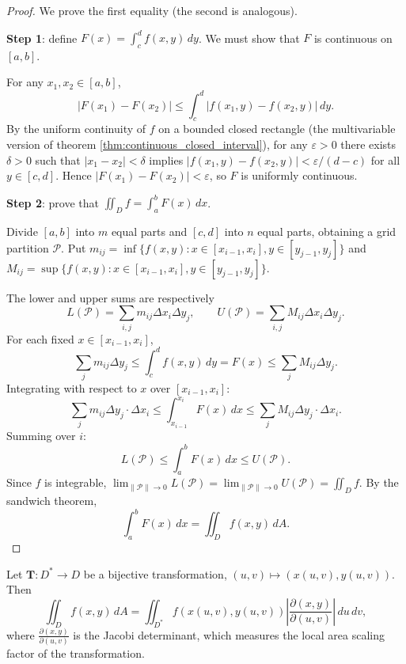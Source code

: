 \begin{proof}
We prove the first equality (the second is analogous).

\textbf{Step 1}: define $F(x) = \int_c^d f(x,y)\,dy$. We must show that $F$ is continuous on $[a,b]$.

For any $x_1, x_2 \in [a,b]$,
\[
|F(x_1) - F(x_2)| \le \int_c^d |f(x_1,y) - f(x_2,y)|\,dy.
\]
By the uniform continuity of $f$ on a bounded closed rectangle (the multivariable version of theorem \ref{thm:continuous_closed_interval}), for any $\varepsilon > 0$ there exists $\delta > 0$ such that $|x_1 - x_2| < \delta$ implies $|f(x_1,y) - f(x_2,y)| < \varepsilon/(d-c)$ for all $y \in [c,d]$. Hence $|F(x_1) - F(x_2)| < \varepsilon$, so $F$ is uniformly continuous.

\textbf{Step 2}: prove that $\iint_D f = \int_a^b F(x)\,dx$.

Divide $[a,b]$ into $m$ equal parts and $[c,d]$ into $n$ equal parts, obtaining a grid partition $\mathcal{P}$. Put $m_{ij} = \inf\{f(x,y) : x \in [x_{i-1}, x_i], y \in [y_{j-1}, y_j]\}$ and $M_{ij} = \sup\{f(x,y) : x \in [x_{i-1}, x_i], y \in [y_{j-1}, y_j]\}$.

The lower and upper sums are respectively
\[
L(\mathcal{P}) = \sum_{i,j} m_{ij}\Delta x_i \Delta y_j, \qquad U(\mathcal{P}) = \sum_{i,j} M_{ij}\Delta x_i \Delta y_j.
\]
For each fixed $x \in [x_{i-1}, x_i]$,
\[
\sum_j m_{ij}\Delta y_j \le \int_c^d f(x,y)\,dy = F(x) \le \sum_j M_{ij}\Delta y_j.
\]
Integrating with respect to $x$ over $[x_{i-1}, x_i]$:
\[
\sum_j m_{ij}\Delta y_j \cdot \Delta x_i \le \int_{x_{i-1}}^{x_i} F(x)\,dx \le \sum_j M_{ij}\Delta y_j \cdot \Delta x_i.
\]
Summing over $i$:
\[
L(\mathcal{P}) \le \int_a^b F(x)\,dx \le U(\mathcal{P}).
\]
Since $f$ is integrable, $\lim_{\|\mathcal{P}\|\to 0} L(\mathcal{P}) = \lim_{\|\mathcal{P}\|\to 0} U(\mathcal{P}) = \iint_D f$. By the sandwich theorem,
\[
\int_a^b F(x)\,dx = \iint_D f(x,y)\,dA.
\]
\end{proof}

\begin{proposition}\label{prop:change_of_variables}
Let $\mathbf{T}: D^* \to D$ be a bijective transformation, $(u, v) \mapsto (x(u,v), y(u,v))$. Then
\[\iint_D f(x, y)\,dA = \iint_{D^*} f(x(u,v), y(u,v)) \left|\frac{\partial(x, y)}{\partial(u, v)}\right|\,du\,dv,\]
where $\frac{\partial(x, y)}{\partial(u, v)}$ is the Jacobi determinant, which measures the local area scaling factor of the transformation.
\end{proposition}

